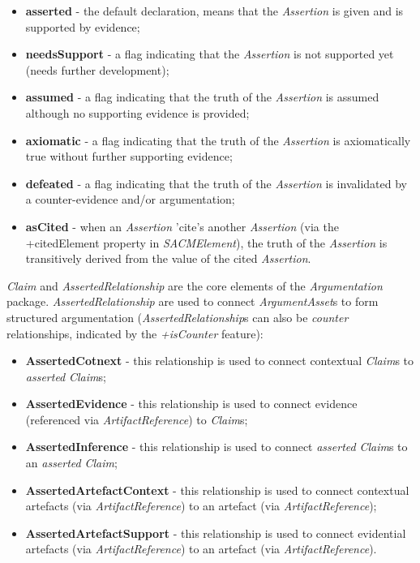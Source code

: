 \begin{itemize}
	\item \textbf{asserted} - the default declaration, means that the \textit{Assertion} is given and is supported by evidence;
	\item \textbf{needsSupport} - a flag indicating that the \textit{Assertion} is not supported yet (needs further development);
	\item \textbf{assumed} - a flag indicating that the truth of the \textit{Assertion} is assumed although no supporting evidence is provided;
	\item \textbf{axiomatic} - a flag indicating that the truth of the \textit{Assertion} is axiomatically true without further supporting evidence;
	\item \textbf{defeated} - a flag indicating that the truth of the \textit{Assertion} is invalidated by a counter-evidence and/or argumentation;
	\item \textbf{asCited} - when an \textit{Assertion} 'cite's another \textit{Assertion} (via the +citedElement property in \textit{SACMElement}), the truth of the \textit{Assertion} is transitively derived from the value of the cited \textit{Assertion}.
\end{itemize}

\textit{Claim} and \textit{AssertedRelationship} are the core elements of the \textit{Argumentation} package. \textit{AssertedRelationship} are used to connect \textit{ArgumentAsset}s to form structured argumentation (\textit{AssertedRelationship}s can also be \textit{counter} relationships, indicated by the \textit{+isCounter} feature):

\begin{itemize}
	\item \textbf{AssertedCotnext} - this relationship is used to connect contextual \textit{Claim}s to \textit{asserted} \textit{Claim}s;
	\item \textbf{AssertedEvidence} - this relationship is used to connect evidence (referenced via \textit{ArtifactReference}) to \textit{Claim}s;
	\item \textbf{AssertedInference} - this relationship is used to connect \textit{asserted} \textit{Claim}s to an \textit{asserted} \textit{Claim};
	\item \textbf{AssertedArtefactContext} - this relationship is used to connect contextual artefacts (via \textit{ArtifactReference}) to an artefact (via \textit{ArtifactReference});
	\item \textbf{AssertedArtefactSupport} - this relationship is used to connect evidential artefacts (via \textit{ArtifactReference}) to an artefact (via \textit{ArtifactReference}).
\end{itemize}

